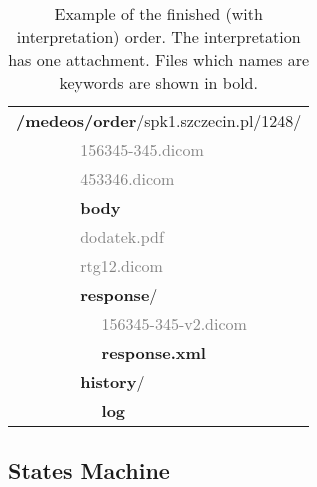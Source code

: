 \documentclass[a4paper]{article}
\begin{document}
\begin{table}
\begin{center}
\begin{tabular}{ p{2cm} p{.2cm} p{.2cm} p{.2cm} p{4cm} }
  \multicolumn{5}{l}{\textbf{/medeos/order}/spk1.szczecin.pl/1248/} \\
   & & & \multicolumn{2}{l}{\textcolor{gray}{156345-345.dicom}} \\
   & & & \multicolumn{2}{l}{\textcolor{gray}{453346.dicom}} \\
   & & & \multicolumn{2}{l}{\textbf{body}} \\
   & & & \multicolumn{2}{l}{\textcolor{gray}{dodatek.pdf}} \\
   & & & \multicolumn{2}{l}{\textcolor{gray}{rtg12.dicom}} \\
   & & & \multicolumn{2}{l}{\textbf{response}/} \\
   & & & & \textcolor{gray}{156345-345-v2.dicom} \\
   & & & & \textbf{response.xml} \\
   & & & \multicolumn{2}{l}{\textbf{history}/} \\
   & & & & \textbf{log} \\
\end{tabular}
\caption[Example finished order]{Example of the finished (with interpretation)
order. The interpretation has one attachment. Files which names are keywords are
shown in bold.}
\label{tab:dir}
\end{center}
\end{table}

\subsection{States Machine}
\end{document}
